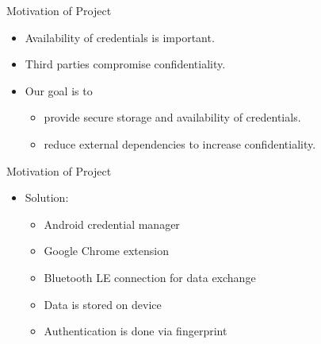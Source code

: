 \documentclass{beamer}
\begin{document}
\begin{frame}{Motivation of Project}
\vspace{-5mm}
\begin{itemize}
	\item Availability of credentials is important.
	\item Third parties compromise confidentiality.
	\item Our goal is to
	\begin{itemize}
		\item provide secure storage and availability of credentials.
		\item reduce external dependencies to increase confidentiality.
	\end{itemize}
\end{itemize}
\end{frame}






\begin{frame}{Motivation of Project}
\begin{itemize}
	\item Solution:
	\begin{itemize}
		\item Android credential manager 
		\item Google Chrome extension
		\item Bluetooth LE connection for data exchange
		\item Data is stored on device
		\item Authentication is done via fingerprint
	\end{itemize}
\end{itemize}
\end{frame}


\end{document}
